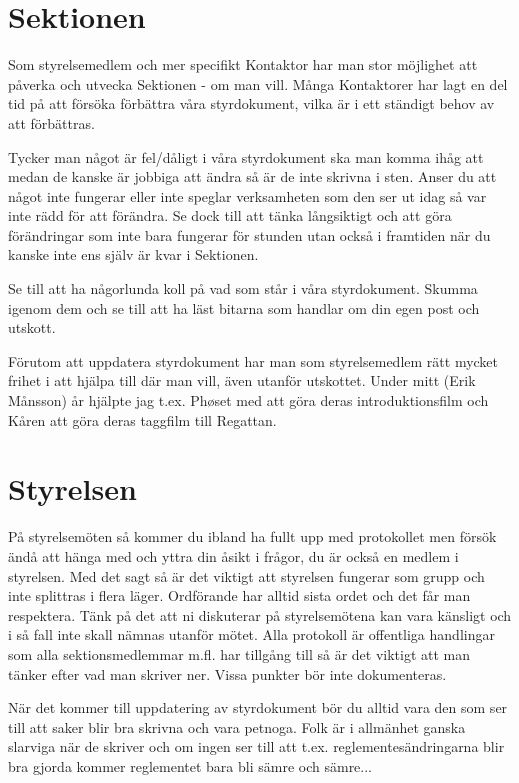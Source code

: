 \documentclass[10pt]{article}
\begin{document}
\tableofcontents
\newpage

\section{Sektionen}
Som styrelsemedlem och mer specifikt Kontaktor har man stor möjlighet att påverka och utvecka Sektionen - om man vill. Många Kontaktorer har lagt en del tid på att försöka förbättra våra styrdokument, vilka är i ett ständigt behov av att förbättras.

Tycker man något är fel/dåligt i våra styrdokument ska man komma ihåg att medan de kanske är jobbiga att ändra så är de inte skrivna i sten. Anser du att något inte fungerar eller inte speglar verksamheten som den ser ut idag så var inte rädd för att förändra. Se dock till att tänka långsiktigt och att göra förändringar som inte bara fungerar för stunden utan också i framtiden när du kanske inte ens själv är kvar i Sektionen.

Se till att ha någorlunda koll på vad som står i våra styrdokument. Skumma igenom dem och se till att ha läst bitarna som handlar om din egen post och utskott.

Förutom att uppdatera styrdokument har man som styrelsemedlem rätt mycket frihet i att hjälpa till där man vill, även utanför utskottet. Under mitt (Erik Månsson) år hjälpte jag t.ex. Ph\o set med att göra deras introduktionsfilm och Kåren att göra deras taggfilm till Regattan.

\section{Styrelsen}
På styrelsemöten så kommer du ibland ha fullt upp med protokollet men försök ändå att hänga med och yttra din åsikt i frågor, du är också en medlem i styrelsen. Med det sagt så är det viktigt att styrelsen fungerar som grupp och inte splittras i flera läger. Ordförande har alltid sista ordet och det får man respektera. Tänk på det att ni diskuterar på styrelsemötena kan vara känsligt och i så fall inte skall nämnas utanför mötet. Alla protokoll är offentliga handlingar som alla sektionsmedlemmar m.fl. har tillgång till så är det viktigt att man tänker efter vad man skriver ner. Vissa punkter bör inte dokumenteras.

När det kommer till uppdatering av styrdokument bör du alltid vara den som ser till att saker blir bra skrivna och vara petnoga. Folk är i allmänhet ganska slarviga när de skriver och om ingen ser till att t.ex. reglementesändringarna blir bra gjorda kommer reglementet bara bli sämre och sämre...
\end{document}
